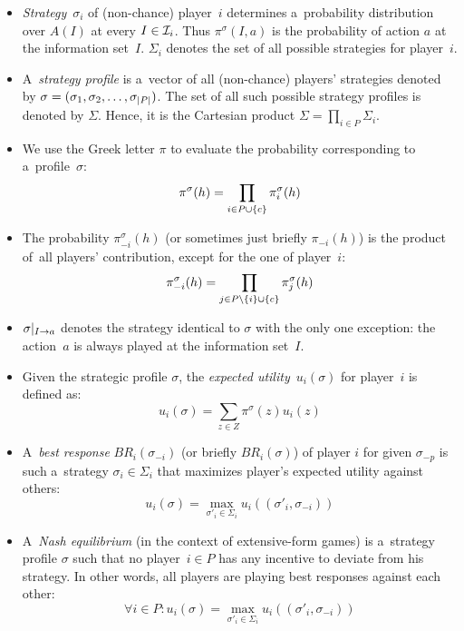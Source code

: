 \begin{itemize}
  \item \emph{Strategy}~$\sigma_i$ of (non-chance) player~$i$ determines a~probability distribution over $A(I)$ at every $I \in \mathcal{I}_i$.
    Thus $\pi ^\sigma (I, a)$ is the probability of action $a$ at the information set~$I$.
    $\Sigma_i$ denotes the set of all possible strategies for player~$i$.
  \item A~\emph{strategy profile} is a~vector of all (non-chance) players' strategies denoted by $\sigma = (\sigma_1, \sigma_2, \ldots, \sigma_ {\left|{P}\right|})$.
    The set of all such possible strategy profiles is denoted by $\Sigma$.
    Hence, it is the Cartesian product $\Sigma = \prod\limits _{i \in P} \Sigma_i$.
  \item We use the Greek letter $\pi$ to evaluate the probability corresponding to a~profile~$\sigma$:
    \[\pi ^\sigma(h) = \prod _{i \in P \cup \left\{ c \right\}} \pi _i ^\sigma (h)\]
    
  \item The probability $\pi _{-i} ^\sigma (h)$ (or sometimes just briefly $\pi _{-i} (h)$) is the product of~all players' contribution, except for the one of player~$i$:
    \[\pi _{-i} ^\sigma(h) = \prod _{j \in P \setminus \left\{ i \right\} \cup \left\{ c \right\}} \pi _j ^\sigma (h)\]
    
  \item $\sigma | _{I \rightarrow a}$ denotes the strategy identical to $\sigma$ with the only one exception:
    the action~$a$ is always played at the information set~$I$.
  \item Given the strategic profile $\sigma$, the \emph{expected utility}~$u_i (\sigma)$ for player~$i$ is defined as:
    \[ u_i (\sigma) = \sum _{z \in Z} \pi ^\sigma (z) u_i(z)\]

  \item A~\emph{best response} $BR _i (\sigma _{-i})$ (or briefly $BR _i (\sigma)$) of player $i$ for given $\sigma _{-p}$ is such a~strategy $\sigma _i \in \Sigma _i$ that maximizes player's expected utility against others:
    \[ u_i (\sigma) = \max _{\sigma'_i \in \Sigma_i} u_i ((\sigma'_i, \sigma_{-i})) \]

  \item A~\emph{Nash equilibrium} (in the context of extensive-form games) is a~strategy profile $\sigma$ such that no player~$i \in P$ has any incentive to deviate from his strategy.
    In other words, all players are playing best responses against each other:
    \[ \forall i \in P\colon u_i (\sigma) = \max _{\sigma'_i \in \Sigma_i} u_i ((\sigma'_i, \sigma_{-i})) \]


\end{itemize}
